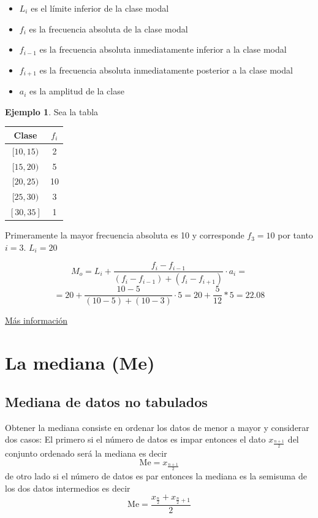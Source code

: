 \documentclass[
  11pt,
]{krantz}
\theoremstyle{definition}
\theoremstyle{definition}
\newtheorem{example}{Ejemplo}[chapter]
\theoremstyle{definition}
\theoremstyle{definition}
\theoremstyle{remark}
\begin{document}
\begin{itemize}
\item
  \(L_i\) es el límite inferior de la clase modal
\item
  \(f_i\) es la frecuencia absoluta de la clase modal
\item
  \(f_{i-1}\) es la frecuencia absoluta inmediatamente inferior a la clase modal
\item
  \(f_{i+1}\) es la frecuencia absoluta inmediatamente posterior a la clase modal
\item
  \(a_i\) es la amplitud de la clase
\end{itemize}

\begin{example}
Sea la tabla

\begin{longtable}[]{@{}cc@{}}
\toprule
Clase & \(f_i\) \\
\midrule
\endhead
\([10,15)\) & 2 \\
\([15,20)\) & 5 \\
\([20,25)\) & 10 \\
\([25,30)\) & 3 \\
\([30,35]\) & 1 \\
\bottomrule
\end{longtable}

Primeramente la mayor frecuencia absoluta es 10 y corresponde \(f_3=10\) por tanto \(i=3\). \(L_i=20\)

\[ M_o=L_i+\frac{f_i-f_{i-1}}{(f_i-f_{i-1})+(f_i-f_{i+1})}\cdot a_i=\] \[ =20+\frac{10-5}{(10-5)+(10-3)}\cdot 5=20+\frac{5}{12}*5=22.08\]

\href{https://www.superprof.es/apuntes/escolar/matematicas/estadistica/descriptiva/moda-estadistica.html}{Más información}
\end{example}

\hypertarget{la-mediana-me}{%
\section{La mediana (Me)}\label{la-mediana-me}}

\hypertarget{mediana-de-datos-no-tabulados}{%
\subsection{Mediana de datos no tabulados}\label{mediana-de-datos-no-tabulados}}

Obtener la mediana consiste en ordenar los datos de menor a mayor y considerar dos casos: El primero si el número de datos es impar entonces el dato \(x_{\frac{n+1}{2}}\) del conjunto ordenado será la mediana es decir \[\text{Me}=x_{\frac{n+1}{2}}\] de otro lado si el número de datos es par entonces la mediana es la semisuma de los dos datos intermedios es decir \[\text{Me}=\frac{x_{\frac{n}{2}}+x_{\frac{n}{2}+1}}{2}\]
\end{document}
